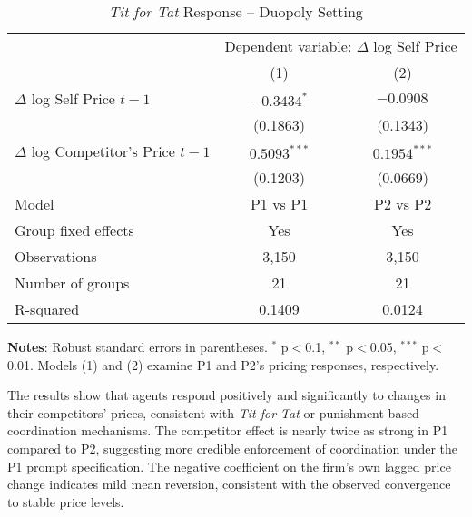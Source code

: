 \begin{table}[htpb!]
    \centering
    \caption{\emph{Tit for Tat} Response -- Duopoly Setting}
    \label{tab:fe_duopoly}
    \begin{threeparttable}
    {\small
    \begin{tabular}{lcc}
    \toprule
    & \multicolumn{2}{c}{Dependent variable: $\Delta$ log Self Price} \\
    \cmidrule(lr){2-3}
    & (1) & (2) \\
    \midrule
    $\Delta$ log Self Price $t-1$         & $-0.3434^{*}$ & $-0.0908^{}$  \\
                             & (0.1863)       & (0.1343)       \\
    $\Delta$ log Competitor's Price $t-1$ & $0.5093^{***}$ & $0.1954^{***}$ \\
                             & (0.1203)       & (0.0669)       \\
    \midrule
    Model                    & P1 vs P1       & P2 vs P2       \\          
    Group fixed effects      & Yes            & Yes            \\
    \midrule
    Observations             & 3,150          & 3,150          \\
    Number of groups         & 21             & 21             \\
    R-squared                & 0.1409         & 0.0124             \\
    \bottomrule
    \end{tabular}
    }
    \begin{tablenotes}[flushleft]
    \footnotesize
    \item \textbf{Notes}: Robust standard errors in parentheses. $^{*}$ p$<$0.1, $^{**}$ p$<$0.05, $^{***}$ p$<$0.01. Models (1) and (2) examine P1 and P2's pricing responses, respectively.
    \end{tablenotes}
    \end{threeparttable}
\end{table}

The results show that agents respond positively and significantly to changes in their competitors' prices, consistent with \emph{Tit for Tat} or punishment-based coordination mechanisms. The competitor effect is nearly twice as strong in P1 compared to P2, suggesting more credible enforcement of coordination under the P1 prompt specification. The negative coefficient on the firm's own lagged price change indicates mild mean reversion, consistent with the observed convergence to stable price levels.

